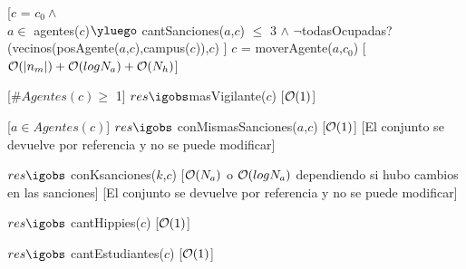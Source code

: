\begin{Interfaz}
	[$c$ = $c_0 \land$\\
	$a \in$ agentes($c$)$\yluego$ cantSanciones($a$,$c$) $\leq$ 3 $\land$ $\neg$todasOcupadas?(vecinos(posAgente($a$,$c$),campus($c$)),$c$) ]
	{$c$ = moverAgente($a$,$c_0$)}
	[$\mathcal{O}(|n_m|) + \mathcal{O}(log N_a) + \mathcal{O}(N_h)$]
	
	[$\#Agentes(c) \geq$ 1]
	{$res \igobs$masVigilante($c$)}
	[$\mathcal{O}(1)$]

	[$a \in Agentes(c)$]
	{$res \igobs$ conMismasSanciones($a$,$c$)}
	[$\mathcal{O}(1)$]
	[El conjunto se devuelve por referencia y no se puede modificar]	
	
	{$res \igobs$ conKsanciones($k$,$c$)}
	[$\mathcal{O}(N_a)$ o $\mathcal{O}(log N_a)$ dependiendo si hubo cambios en las sanciones]
	[El conjunto se devuelve por referencia y no se puede modificar]
		
	{$res \igobs$ cantHippies($c$)}
	[$\mathcal{O}(1)$]

	{$res \igobs$ cantEstudiantes($c$)}
	[$\mathcal{O}(1)$]	
	
\end{Interfaz}

